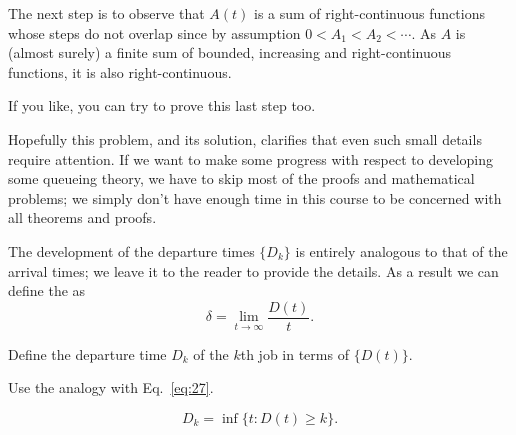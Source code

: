 \begin{exercise}
\begin{solution}
    The next step is to observe that $A(t)$ is a sum of
    right-continuous functions whose steps do not overlap since by
    assumption $0<A_1 < A_2 < \cdots$. As $A$ is (almost surely)
    a finite sum of bounded, increasing and right-continuous functions,
    it is also right-continuous.

    If you like, you can try to prove this last step too. 

  Hopefully this problem, and its solution, clarifies that even such
  small details require attention. If we want to make some progress
  with respect to developing some queueing theory, we have to skip
  most of the proofs and mathematical problems; we simply don't have
  enough time in this course  to be concerned with all theorems
  and proofs.

 \end{solution}
\end{exercise}

The development of the departure times $\{D_k\}$ is entirely analogous
to that of the arrival times; we leave it to the reader to provide the
details. As a result we can define the  as
\begin{equation}\label{eq:28}
  \delta = \lim_{t\to\infty} \frac{D(t)}t.
\end{equation}


\begin{exercise}
  Define the departure time $D_{k}$ of the $k$th job in terms of
  $\{D(t)\}$. 
  \begin{hint}
Use the analogy with Eq.~\eqref{eq:27}.
  \end{hint}
\begin{solution}
  \begin{equation*}
 D_{k} = \inf\{t: D(t) \geq k\}.
  \end{equation*}
\end{solution}
\end{exercise}

